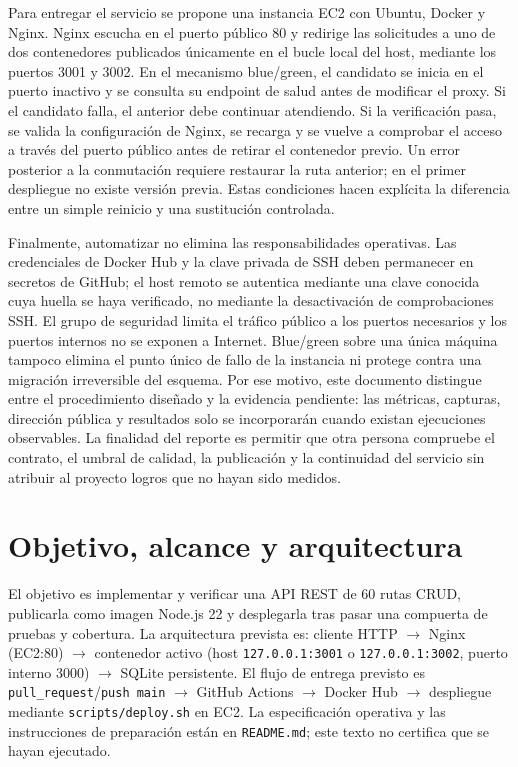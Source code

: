 \documentclass[12pt,a4paper]{article}
\begin{document}
Para entregar el servicio se propone una instancia EC2 con Ubuntu, Docker y Nginx. Nginx escucha en el puerto público 80 y redirige las solicitudes a uno de dos contenedores publicados únicamente en el bucle local del host, mediante los puertos 3001 y 3002. En el mecanismo blue/green, el candidato se inicia en el puerto inactivo y se consulta su endpoint de salud antes de modificar el proxy. Si el candidato falla, el anterior debe continuar atendiendo. Si la verificación pasa, se valida la configuración de Nginx, se recarga y se vuelve a comprobar el acceso a través del puerto público antes de retirar el contenedor previo. Un error posterior a la conmutación requiere restaurar la ruta anterior; en el primer despliegue no existe versión previa. Estas condiciones hacen explícita la diferencia entre un simple reinicio y una sustitución controlada.

Finalmente, automatizar no elimina las responsabilidades operativas. Las credenciales de Docker Hub y la clave privada de SSH deben permanecer en secretos de GitHub; el host remoto se autentica mediante una clave conocida cuya huella se haya verificado, no mediante la desactivación de comprobaciones SSH. El grupo de seguridad limita el tráfico público a los puertos necesarios y los puertos internos no se exponen a Internet. Blue/green sobre una única máquina tampoco elimina el punto único de fallo de la instancia ni protege contra una migración irreversible del esquema. Por ese motivo, este documento distingue entre el procedimiento diseñado y la evidencia pendiente: las métricas, capturas, dirección pública y resultados solo se incorporarán cuando existan ejecuciones observables. La finalidad del reporte es permitir que otra persona compruebe el contrato, el umbral de calidad, la publicación y la continuidad del servicio sin atribuir al proyecto logros que no hayan sido medidos.
\clearpage

\section{Objetivo, alcance y arquitectura}
El objetivo es implementar y verificar una API REST de 60 rutas CRUD, publicarla como imagen Node.js 22 y desplegarla tras pasar una compuerta de pruebas y cobertura. La arquitectura prevista es: cliente HTTP $\rightarrow$ Nginx (EC2:80) $\rightarrow$ contenedor activo (host \texttt{127.0.0.1:3001} o \texttt{127.0.0.1:3002}, puerto interno 3000) $\rightarrow$ SQLite persistente. El flujo de entrega previsto es \texttt{pull\_request}/\texttt{push main} $\rightarrow$ GitHub Actions $\rightarrow$ Docker Hub $\rightarrow$ despliegue mediante \texttt{scripts/deploy.sh} en EC2. La especificación operativa y las instrucciones de preparación están en \texttt{README.md}; este texto no certifica que se hayan ejecutado.
\end{document}
